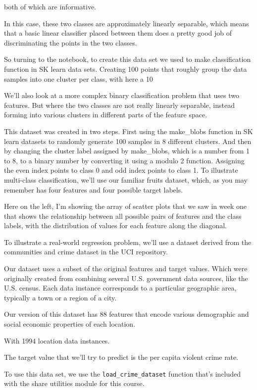 \begin{multicols}{2}
both of which are informative. 

In this case, these two classes are approximately linearly separable, which means that a basic linear classifier placed between them does a pretty good job of discriminating the points in the two classes. 

So turning to the notebook, to create this data set we used to make classification function in SK learn data sets. Creating 100 points that roughly group the data samples into one cluster per class, with here a 10%

We'll also look at a more complex binary classification problem that uses two features. But where the two classes are not really linearly separable, instead forming into various clusters in different parts of the feature space. 

This dataset was created in two steps. First using the make_blobs function in SK learn datasets to randomly generate 100 samples in 8 different clusters. And then by changing the cluster label assigned by make_blobs, which is a number from 1 to 8, to a binary number by converting it using a modulo 2 function. Assigning the even index points to class 0 and odd index points to class 1. To illustrate multi-class classification, we'll use our familiar fruits dataset, which, as you may remember has four features and four possible target labels. 

Here on the left, I'm showing the array of scatter plots that we saw in week one that shows the relationship between all possible pairs of features and the class labels, with the distribution of values for each feature along the diagonal. 

To illustrate a real-world regression problem, we'll use a dataset derived from the communities and crime dataset in the UCI repository. 

Our dataset uses a subset of the original features and target values. Which were originally created from combining several U.S. government data sources, like the U.S. census. Each data instance corresponds to a particular geographic area, typically a town or a region of a city. 

Our version of this dataset has 88 features that encode various demographic and social economic properties of each location. 

With 1994 location data instances. 

The target value that we'll try to predict is the per capita violent crime rate. 

To use this data set, we use the \texttt{load_crime_dataset} function that's included with the share utilities module for this course.

\end{multicols}